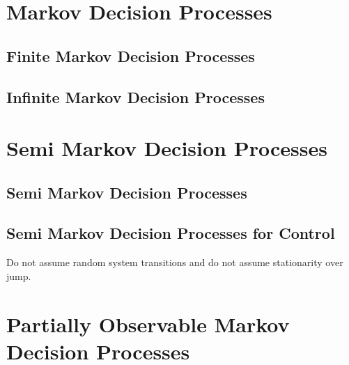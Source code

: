 \section{Markov Decision Processes}
\subsection{Finite Markov Decision Processes}
\subsection{Infinite Markov Decision Processes}

\section{Semi Markov Decision Processes}
\subsection{Semi Markov Decision Processes}
\subsection{Semi Markov Decision Processes for Control}
Do not assume random system transitions and do not assume stationarity over jump.

\section{Partially Observable Markov Decision Processes}
